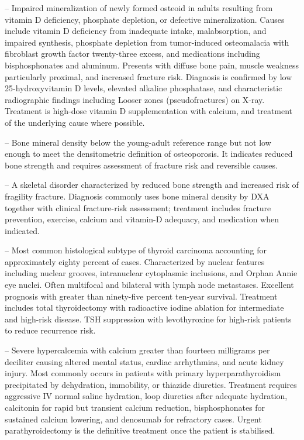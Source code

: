 -- Impaired mineralization of newly formed osteoid in adults resulting from vitamin D deficiency, phosphate depletion, or defective mineralization. Causes include vitamin D deficiency from inadequate intake, malabsorption, and impaired synthesis, phosphate depletion from tumor-induced osteomalacia with fibroblast growth factor twenty-three excess, and medications including bisphosphonates and aluminum. Presents with diffuse bone pain, muscle weakness particularly proximal, and increased fracture risk. Diagnosis is confirmed by low 25-hydroxyvitamin D levels, elevated alkaline phosphatase, and characteristic radiographic findings including Looser zones (pseudofractures) on X-ray. Treatment is high-dose vitamin D supplementation with calcium, and treatment of the underlying cause where possible.

-- Bone mineral density below the young-adult reference range but not low enough to meet the densitometric definition of osteoporosis. It indicates reduced bone strength and requires assessment of fracture risk and reversible causes.

-- A skeletal disorder characterized by reduced bone strength and increased risk of fragility fracture. Diagnosis commonly uses bone mineral density by DXA together with clinical fracture-risk assessment; treatment includes fracture prevention, exercise, calcium and vitamin-D adequacy, and medication when indicated.

-- Most common histological subtype of thyroid carcinoma accounting for approximately eighty percent of cases. Characterized by nuclear features including nuclear grooves, intranuclear cytoplasmic inclusions, and Orphan Annie eye nuclei. Often multifocal and bilateral with lymph node metastases. Excellent prognosis with greater than ninety-five percent ten-year survival. Treatment includes total thyroidectomy with radioactive iodine ablation for intermediate and high-risk disease. TSH suppression with levothyroxine for high-risk patients to reduce recurrence risk.

-- Severe hypercalcemia with calcium greater than fourteen milligrams per deciliter causing altered mental status, cardiac arrhythmias, and acute kidney injury. Most commonly occurs in patients with primary hyperparathyroidism precipitated by dehydration, immobility, or thiazide diuretics. Treatment requires aggressive IV normal saline hydration, loop diuretics after adequate hydration, calcitonin for rapid but transient calcium reduction, bisphosphonates for sustained calcium lowering, and denosumab for refractory cases. Urgent parathyroidectomy is the definitive treatment once the patient is stabilised.

